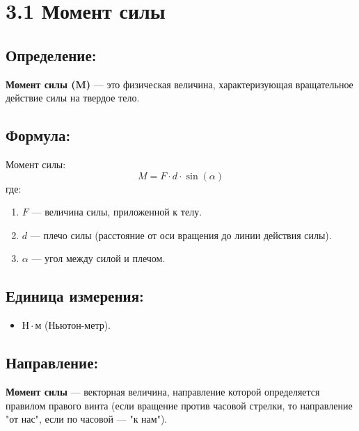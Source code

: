 \documentclass[a4paper,12pt]{article}
\begin{document}
\begin{center}
\end{center}

\vspace{-2.5em}

\section*{3.1 Момент силы}
\vspace{-9pt}
\subsection*{Определение:}
\vspace{-3pt}
\textbf{Момент силы (M)} — это физическая величина, характеризующая вращательное действие силы на твердое тело.

\vspace{-9pt}
\subsection*{Формула:}
\vspace{-3pt}
Момент силы:
\vspace{-0.05em}
$$ M = F \cdot d \cdot \sin(\alpha) $$
где:
\begin{enumerate} [itemsep=0pt, topsep=0pt, parsep=0pt]
    \item $F$ — величина силы, приложенной к телу.
    \item $d$ — плечо силы (расстояние от оси вращения до линии действия силы).
    \item $\alpha$ — угол между силой и плечом.
\end{enumerate}

\vspace{-9pt}
\subsection*{Единица измерения:}
\vspace{-3pt}
\begin{itemize} [itemsep=0pt, topsep=0pt, parsep=0pt]
    \item $Н \cdot м$ (Ньютон-метр).
\end{itemize}

\vspace{-9pt}
\subsection*{Направление:}
\vspace{-3pt}
\textbf{Момент силы} — векторная величина, направление которой определяется правилом правого винта (если вращение против часовой стрелки, то направление "от нас", если по часовой — "к нам").
\end{document}
